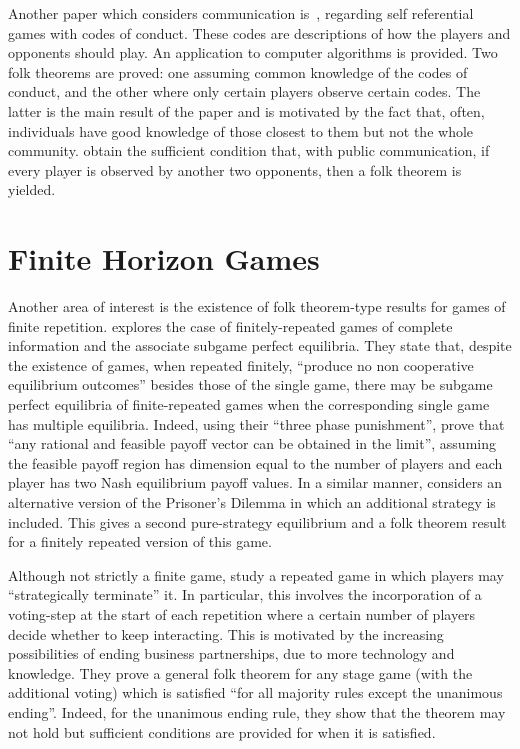 Another paper which considers communication is~\cite{Block2016}, regarding self
referential games with codes of conduct. These codes are descriptions of how the
players and opponents should play. An application to computer algorithms is
provided. Two folk theorems are proved: one assuming common knowledge of the
codes of conduct, and the other where only certain players observe certain
codes. The latter is the main result of the paper and is motivated by the fact
that, often, individuals have good knowledge of those closest to them but not
the whole community. \cite{Block2016} obtain the sufficient condition that, with
public communication, if every player is observed by another two opponents, then
a folk theorem is yielded.


\section{Finite Horizon Games}\label{sec:Finite_Horizon_Games}
Another area of interest is the existence of folk theorem-type results for games
of finite repetition. \cite{Benoit_1985} explores the case of finitely-repeated
games of complete information and the associate subgame perfect equilibria. They
state that, despite the existence of games, when repeated finitely, ``produce no
non cooperative equilibrium outcomes'' besides those of the single game, there
may be subgame perfect equilibria of finite-repeated games when the
corresponding single game has multiple equilibria. Indeed, using their ``three
phase punishment'', \cite{Benoit_1985} prove that ``any rational and feasible
payoff vector can be obtained in the limit'', assuming the feasible payoff
region has dimension equal to the number of players and each player has two Nash
equilibrium payoff values. In a similar manner, \cite{ANGELOVA2011} considers an
alternative version of the Prisoner's Dilemma in which an additional strategy is
included. This gives a second pure-strategy equilibrium and a folk theorem
result for a finitely repeated version of this game. 

Although not strictly a finite game, \cite{Fujiwara-Greve2018} study a repeated
game in which players may ``strategically terminate'' it. In particular, this
involves the incorporation of a voting-step at the start of each repetition
where a certain number of players decide whether to keep interacting. This is
motivated by the increasing possibilities of ending business partnerships, due
to more technology and knowledge. They prove a general folk theorem for any
stage game (with the additional voting) which is satisfied ``for all majority
rules except the unanimous ending''. Indeed, for the unanimous ending rule, they
show that the theorem may not hold but sufficient conditions are
provided for when it is satisfied.


